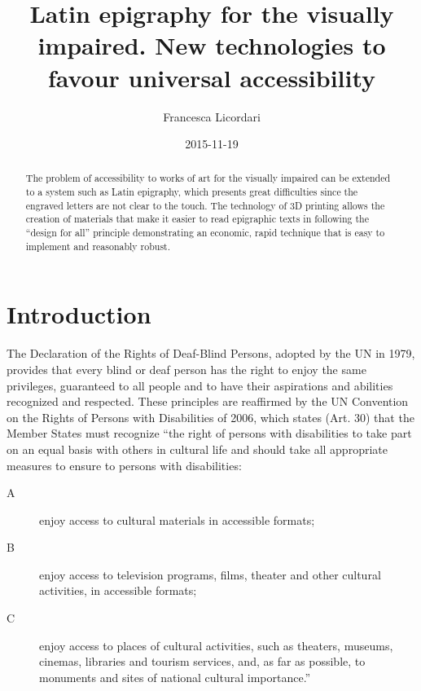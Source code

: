 \documentclass[amsthm,ebook]{saparticle}
\title{Latin epigraphy for the visually impaired. New technologies to favour universal accessibility}
\author[mne]{Francesca Licordari\corref{first}}
\date{2015-11-19}
\begin{document}
\maketitle
\begin{abstract}
The problem of accessibility to works of art for the visually impaired can be extended to a system such as Latin
epigraphy, which presents great difficulties since the engraved letters are not clear to the touch. The technology of
3D printing allows the creation of materials that make it easier to read epigraphic texts in following the ``design for
all'' principle demonstrating an economic, rapid technique that is easy to implement and reasonably robust.
\end{abstract}




\section{Introduction}
\noindent The Declaration of the Rights of Deaf-Blind Persons, adopted by the UN in 1979, provides that every blind or deaf person
has the right to enjoy the same privileges, guaranteed to all people and to have their aspirations and abilities
recognized and respected. These principles are reaffirmed by the UN Convention on the Rights of Persons with
Disabilities of 2006, which states (Art. 30) that the Member States must recognize ``the right of persons with
disabilities to take part on an equal basis with others in cultural life and should take all appropriate measures to
ensure to persons with disabilities:

\begin{description}
\item[A] enjoy access to cultural materials in accessible formats;

\item[B] enjoy access to television programs, films, theater and other cultural activities, in accessible formats;

\item[C] enjoy access to places of cultural activities, such as theaters, museums, cinemas, libraries and tourism services,
and, as far as possible, to monuments and sites of national cultural importance.''

\end{description}
\end{document}
